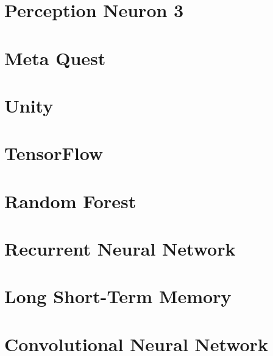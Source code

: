 \cite{GBBSP23}

\section{Perception Neuron 3}
\section{Meta Quest}
\section{Unity}
\section{TensorFlow}
\section{Random Forest}
\section{Recurrent Neural Network}
\section{Long Short-Term Memory}
\section{Convolutional Neural Network}
